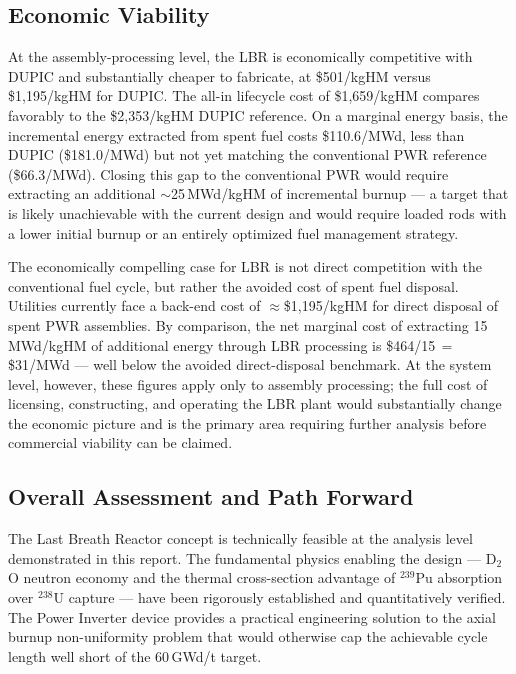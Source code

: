 \subsection{Economic Viability}

At the assembly-processing level, the LBR is economically competitive with
DUPIC and substantially cheaper to fabricate, at \$501/kgHM versus
\$1,195/kgHM for DUPIC. The all-in lifecycle cost of \$1,659/kgHM compares
favorably to the \$2,353/kgHM DUPIC reference. On a marginal energy basis,
the incremental energy extracted from spent fuel costs \$110.6/MWd, less
than DUPIC (\$181.0/MWd) but not yet matching the conventional PWR reference
(\$66.3/MWd). Closing this gap to the conventional PWR would require
extracting an additional $\sim$25\,MWd/kgHM of incremental burnup --- a
target that is likely unachievable with the current design and would require loaded rods with a lower initial burnup or an entirely optimized fuel
management strategy.

The economically compelling case for LBR is not direct competition with
the conventional fuel cycle, but rather the avoided cost of spent fuel
disposal. Utilities currently face a back-end cost of $\approx$\$1,195/kgHM
for direct disposal of spent PWR assemblies. By comparison, the net marginal
cost of extracting 15\,MWd/kgHM of additional energy through LBR processing
is \$464/15\,$=$\,\$31/MWd --- well below the avoided direct-disposal
benchmark. At the system level, however, these figures apply only to assembly
processing; the full cost of licensing, constructing, and operating the LBR
plant would substantially change the economic picture and is the primary area
requiring further analysis before commercial viability can be claimed.

\subsection{Overall Assessment and Path Forward}

The Last Breath Reactor concept is technically feasible at the analysis level
demonstrated in this report. The fundamental physics enabling the design ---
D$_2$O neutron economy and the thermal cross-section advantage of
$^{239}$Pu absorption over $^{238}$U capture --- have been rigorously
established and quantitatively verified. The Power Inverter device provides a
practical engineering solution to the axial burnup non-uniformity problem that
would otherwise cap the achievable cycle length well short of the 60\,GWd/t
target.

